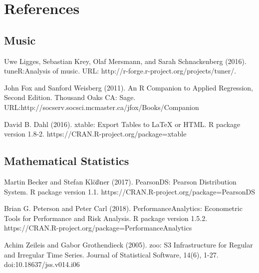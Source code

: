\section{References}

\subsection{Music}

Uwe Ligges, Sebastian Krey, Olaf Mersmann, and Sarah Schnackenberg (2016). 
\newblock tuneR:Analysis of music. 
\newblock URL: http://r-forge.r-project.org/projects/tuner/.

John Fox and Sanford Weisberg (2011). 
\newblock An {R} Companion to Applied Regression, 
\newblock Second Edition. Thousand Oaks CA: Sage. URL:http://socserv.socsci.mcmaster.ca/jfox/Books/Companion

David B. Dahl (2016). 
\newblock xtable: Export Tables to LaTeX or HTML. 
\newblock R package version 1.8-2. https://CRAN.R-project.org/package=xtable

\subsection{Mathematical Statistics}

Martin Becker and Stefan Klößner (2017). 
\newblock PearsonDS: Pearson Distribution System. 
\newblock R package version 1.1. https://CRAN.R-project.org/package=PearsonDS

Brian G. Peterson and Peter Carl (2018). PerformanceAnalytics: Econometric Tools for
\newblock Performance and Risk Analysis. R package version 1.5.2.
\newblock https://CRAN.R-project.org/package=PerformanceAnalytics

 Achim Zeileis and Gabor Grothendieck (2005). 
\newblock zoo: S3 Infrastructure for Regular and Irregular Time Series. 
\newblock Journal of Statistical Software, 14(6), 1-27. doi:10.18637/jss.v014.i06

